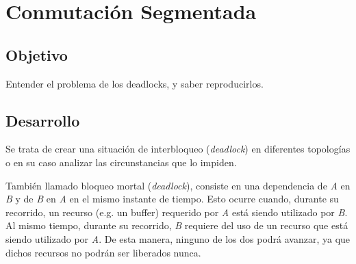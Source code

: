 \section{Conmutación Segmentada}\label{sec:p02intro}

\subsection{Objetivo}\label{ssec:p02objetivo}

\normalsize Entender el problema de los deadlocks, y saber reproducirlos.

\subsection{Desarrollo}\label{ssec:p02desarrollo}

Se trata de crear una situación de interbloqueo (\emph{deadlock}) en diferentes topologías o en su caso analizar las circunstancias que lo impiden.

\begin{keyconceptbox}[Interbloqueo]
    También llamado bloqueo mortal (\emph{deadlock}), consiste en una dependencia de \emph{A} en \emph{B} y de \emph{B} en \emph{A} en el mismo instante de tiempo. Esto ocurre cuando, durante su recorrido, un recurso (e.g. un buffer) requerido por \emph{A} está siendo utilizado por \emph{B}. Al mismo tiempo, durante su recorrido, \emph{B} requiere del uso de un recurso que está siendo utilizado por \emph{A}. De esta manera, ninguno de los dos podrá avanzar, ya que dichos recursos no podrán ser liberados nunca.

    \vspace{10pt}

    \centering 	{} \label{fig:diagrama-interbloqueo}
    
\end{keyconceptbox}

